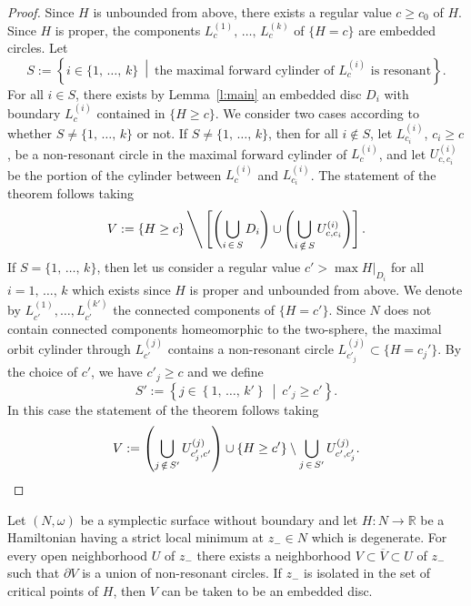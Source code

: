 \documentclass[AHL,Unicode,longabstracts,published]{cedram}
\newcommand{\R}{\mathbb{R}}
\newcommand{\p}{\partial}
\begin{document}
\begin{proof}
Since $H$ is unbounded from above, there exists a regular value $c\geq c_0$ of $H$. Since $H$ is proper, the components $L_c^{(1)},\,\ldots,\,L_c^{(k)}$ of $\{H=c\}$ are embedded circles. Let
\[
S:=\left\{i\in \{1,\,\ldots,\,k\}\ \middle|\ \text{the maximal forward cylinder of $L_c^{(i)}$ is resonant}\right\}.
\]
For all $i\in S$, there exists by Lemma~\ref{l:main} an embedded disc $D_i$ with boundary $L_c^{(i)}$ contained in $\{H\geq c\}$. We consider two cases according to whether $S\neq\{1,\,\ldots,\,k\}$ or not. If $S\neq\{1,\,\ldots,\,k\}$, then for all $i\notin S$, let $L_{c_i}^{(i)}$, $c_i\geq c$, be a non-resonant circle in the maximal forward cylinder of $L_c^{(i)}$, and let $U_{c,c_i}^{(i)}$ be the portion of the cylinder between $L_c^{(i)}$ and $L_{c_i}^{(i)}$. The statement of the theorem follows taking
\begin{equation*}
V:=\left\{H\geq c\right\}\Bigg\backslash\left[\left(\bigcup_{i\,\in\,S}D_i\right)\cup\left(\bigcup_{i\,\notin\,S}U_{c,c_i}^{(i)}\right)\right].
\end{equation*}
If $S=\{1,\,\ldots,\,k\}$, then let us consider a regular value $c'> \max H|_{D_i}$ for all $i=1,\,\ldots,\,k$ which exists since $H$ is proper and unbounded from above. We denote by $L_{c'}^{(1)},\ldots,L_{c'}^{(k')}$ the connected components of $\{H=c'\}$. Since $N$ does not contain connected components homeomorphic to the two-sphere, the maximal orbit cylinder through $L_{c'}^{(j)}$ contains a non-resonant circle $L_{c'_j}^{(j)}\subset\{H=c_j'\}$. By the choice of $c'$, we have $c'_j\geq c$ and we define 
\[
S':=\left\{j\in \left\{1,\,\ldots,\,k'\right\}\ \middle|\ c'_j\geq c'\right\}.
\]
In this case the statement of the theorem follows taking
\[
V:=\left(\bigcup_{j\,\notin\,S'}U_{c'_j,c'}^{(j)}\right)\cup\left\{H\geq c'\right\}\setminus\bigcup_{j\,\in\,S'}U_{c',c'_j}^{(j)}.\qedhere
\]
\end{proof}

\begin{theo}\label{t:z-}
Let $(N,\omega)$ be a symplectic surface without boundary and let $H:N\to\R$ be a Hamiltonian having a strict local minimum at $z_-\in N$ which is degenerate. For every open neighborhood $U$ of $z_-$ there exists a neighborhood $V\subset \overline V \subset U$ of $z_-$ such that $\p V$ is a union of non-resonant circles. If $z_-$ is isolated in the set of critical points of $H$, then $V$ can be taken to be an embedded disc.
\end{theo}
\end{document}
